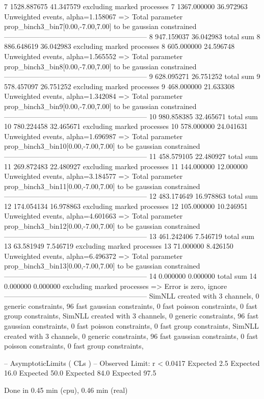 7          1528.887675     41.347579       excluding marked processes    
7          1367.000000     36.972963       Unweighted events, alpha=1.158067
  => Total parameter prop_binch3_bin7[0.00,-7.00,7.00] to be gaussian constrained
------------------------------------------------------------
8          947.159037      36.042983       total sum                     
8          886.648619      36.042983       excluding marked processes    
8          605.000000      24.596748       Unweighted events, alpha=1.565552
  => Total parameter prop_binch3_bin8[0.00,-7.00,7.00] to be gaussian constrained
------------------------------------------------------------
9          628.095271      26.751252       total sum                     
9          578.457097      26.751252       excluding marked processes    
9          468.000000      21.633308       Unweighted events, alpha=1.342084
  => Total parameter prop_binch3_bin9[0.00,-7.00,7.00] to be gaussian constrained
------------------------------------------------------------
10         980.858385      32.465671       total sum                     
10         780.224458      32.465671       excluding marked processes    
10         578.000000      24.041631       Unweighted events, alpha=1.696987
  => Total parameter prop_binch3_bin10[0.00,-7.00,7.00] to be gaussian constrained
------------------------------------------------------------
11         458.579105      22.480927       total sum                     
11         269.872483      22.480927       excluding marked processes    
11         144.000000      12.000000       Unweighted events, alpha=3.184577
  => Total parameter prop_binch3_bin11[0.00,-7.00,7.00] to be gaussian constrained
------------------------------------------------------------
12         483.174649      16.978863       total sum                     
12         174.054134      16.978863       excluding marked processes    
12         105.000000      10.246951       Unweighted events, alpha=4.601663
  => Total parameter prop_binch3_bin12[0.00,-7.00,7.00] to be gaussian constrained
------------------------------------------------------------
13         461.242406      7.546719        total sum                     
13         63.581949       7.546719        excluding marked processes    
13         71.000000       8.426150        Unweighted events, alpha=6.496372
  => Total parameter prop_binch3_bin13[0.00,-7.00,7.00] to be gaussian constrained
------------------------------------------------------------
14         0.000000        0.000000        total sum                     
14         0.000000        0.000000        excluding marked processes    
  => Error is zero, ignore      
------------------------------------------------------------
SimNLL created with 3 channels, 0 generic constraints, 96 fast gaussian constraints, 0 fast poisson constraints, 0 fast group constraints, 
SimNLL created with 3 channels, 0 generic constraints, 96 fast gaussian constraints, 0 fast poisson constraints, 0 fast group constraints, 
SimNLL created with 3 channels, 0 generic constraints, 96 fast gaussian constraints, 0 fast poisson constraints, 0 fast group constraints, 

 -- AsymptoticLimits ( CLs ) --
Observed Limit: r < 0.0417
Expected  2.5%
Expected 16.0%
Expected 50.0%
Expected 84.0%
Expected 97.5%

Done in 0.45 min (cpu), 0.46 min (real)
